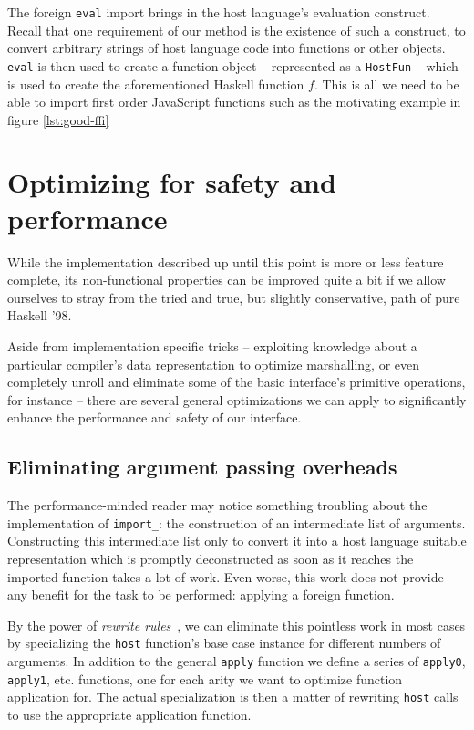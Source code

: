 \documentclass{sigplanconf}
\begin{document}
The foreign \lstinline!eval! import brings in the host language's evaluation
construct. Recall that one requirement of our method is the existence of such
a construct, to convert arbitrary strings of host language code into functions
or other objects. \lstinline!eval! is then used to create a function object --
represented as a \lstinline!HostFun! -- which is used to create the
aforementioned Haskell function $f$.
This is all we need to be able to import first order JavaScript functions
such as the motivating example in figure \ref{lst:good-ffi}

\section{Optimizing for safety and performance}
\label{sec:optimizations}
While the implementation described up until this point is more or less
feature complete, its non-functional properties can be improved quite a bit
if we allow ourselves to stray from the tried and true, but slightly
conservative, path of pure Haskell '98.

Aside from implementation specific tricks -- exploiting knowledge about a
particular compiler's data representation to optimize marshalling, or even
completely unroll and eliminate some of the basic interface's primitive
operations, for instance -- there are several general optimizations we can
apply to significantly enhance the performance and safety of our interface.

\subsection{Eliminating argument passing overheads}
\label{sec:specialization}
The performance-minded reader may notice something troubling about the
implementation of \lstinline!import_!: the construction of an intermediate list
of arguments. Constructing this intermediate list only to convert it into a
host language suitable representation which is promptly deconstructed as soon
as it reaches the imported function takes a lot of work. Even worse, this work
does not provide any benefit for the task to be performed: applying a foreign
function.

By the power of \emph{rewrite rules}\ \cite{rewriterules}, we can
eliminate this pointless work in most cases by specializing the
\lstinline!host! function's base case instance for different numbers of
arguments.
In addition to the general \lstinline!apply! function we define a series of
\lstinline!apply0!, \lstinline!apply1!, etc. functions, one for each arity
we want to optimize function application for.
The actual specialization is then a matter of
rewriting \lstinline!host! calls to use the appropriate application function.
\end{document}
